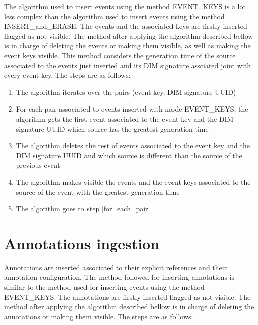 The algorithm used to insert events using the method EVENT\_KEYS is a lot less complex than the algorithm used to insert events using the method INSERT\_and\_ERASE.
The events and the associated keys are firstly inserted flagged as not visible. The method after applying the algorithm described bellow is in charge of deleting the events or making them visible, as well as making the event keys visible.
This method considers the generation time of the source associated to the events just inserted and its DIM signature assciated joint with every event key.
The steps are as follows:

\begin{enumerate}

\item The algorithm iterates over the pairs (event key, DIM signature UUID)
\item \label{for_each_pair} For each pair associated to events inserted with mode EVENT\_KEYS, the algorithm gets the first event associated to the event key and the DIM signature UUID which source has the greatest generation time
\item The algorithm deletes the rest of events associated to the event key and the DIM signature UUID and which source is different than the source of the previous event
\item The algorithm makes visible the events and the event keys associated to the source of the event with the greatest generation time
\item The algorithm goes to step \ref{for_each_pair}
\end{enumerate}

\section{Annotations ingestion}

Annotations are inserted associated to their explicit references and their annotation configuration.
The method followed for inserting annotations is similar to the method used for inserting events using the method EVENT\_KEYS.
The annotations are firstly inserted flagged as not visible. The method after applying the algorithm described bellow is in charge of deleting the annotations or making them visible.
The steps are as follows:

